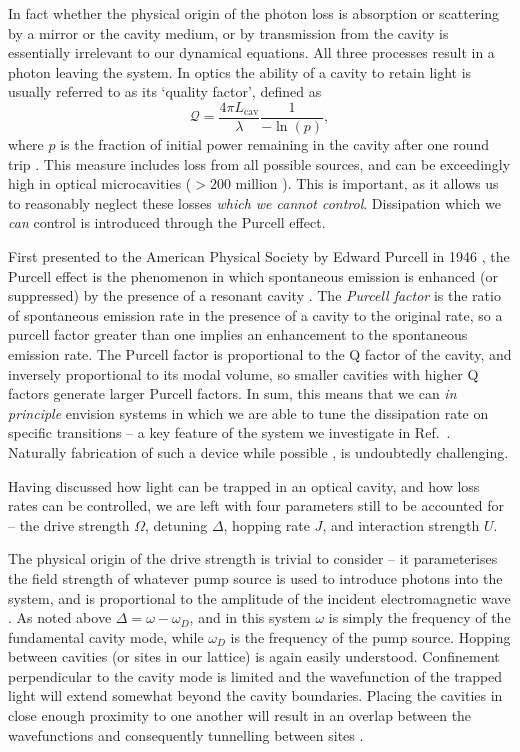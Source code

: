 In fact whether the physical origin of the photon loss is absorption or scattering by a mirror or the cavity medium, or by transmission from the cavity is essentially irrelevant to our dynamical equations. All three processes result in a photon leaving the system. In optics the ability of a cavity to retain light is usually referred to as its `quality factor', defined as
\begin{equation}
	\mathcal{Q} = \frac{4\pi L_{\mathrm{cav}}}{\lambda} \frac{1}{-\ln(p)},
	\label{eq:mbq2-5}
\end{equation}
where \(p\) is the fraction of initial power remaining in the cavity after one round trip \cite{Siegman_chp11}. This measure includes loss from all possible sources, and can be exceedingly high in optical microcavities (\(>200\) million \cite{Yang2017}). This is important, as it allows us to reasonably neglect these losses \emph{which we cannot control}. Dissipation which we \emph{can} control is introduced through the Purcell effect.

First presented to the American Physical Society by Edward Purcell in 1946 \cite{Purcell1946}, the Purcell effect is the phenomenon in which spontaneous emission is enhanced (or suppressed) by the presence of a resonant cavity \cite{Fox_Purcell}. The \emph{Purcell factor} is the ratio of spontaneous emission rate in the presence of a cavity to the original rate, so a purcell factor greater than one implies an enhancement to the spontaneous emission rate. The Purcell factor is proportional to the Q factor of the cavity, and inversely proportional to its modal volume, so smaller cavities with higher Q factors generate larger Purcell factors. In sum, this means that we can \emph{in principle} envision systems in which we are able to tune the dissipation rate on specific transitions -- a key feature of the system we investigate in Ref.~\cite{Brown2018}. Naturally fabrication of such a device while possible \cite{Gerard1998}, is undoubtedly challenging.

Having discussed how light can be trapped in an optical cavity, and how loss rates can be controlled, we are left with four parameters still to be accounted for -- the drive strength \(\Omega\), detuning \(\Delta\), hopping rate \(J\), and interaction strength \(U\).

The physical origin of the drive strength is trivial to consider -- it parameterises the field strength of whatever pump source is used to introduce photons into the system, and is proportional to the amplitude of the incident electromagnetic wave \cite{Fox_Omega}. As noted above \(\Delta = \omega - \omega_{D}\), and in this system \(\omega\) is simply the frequency of the fundamental cavity mode, while \(\omega_{D}\) is the frequency of the pump source. Hopping between cavities (or sites in our lattice) is again easily understood. Confinement perpendicular to the cavity mode is limited and the wavefunction of the trapped light will extend somewhat beyond the cavity boundaries. Placing the cavities in close enough proximity to one another will result in an overlap between the wavefunctions and consequently tunnelling between sites \cite{Hartmann2006,Hartmann2008}. 

